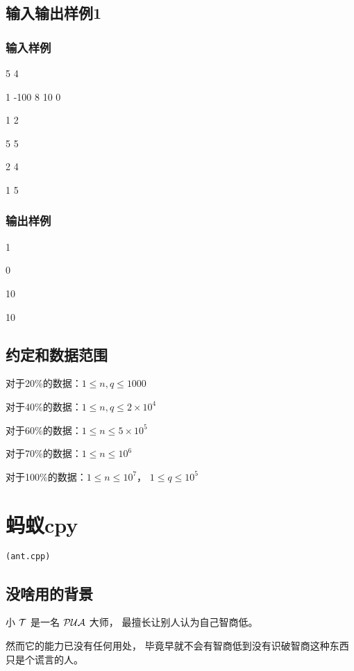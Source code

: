 \documentclass[UTF8]{ctexart}
\begin{document}
\subsection{输入输出样例1}

\subsubsection{输入样例}

5 4

1 -100 8 10 0

1 2

5 5

2 4

1 5

\subsubsection{输出样例}

1

0

10

10

\subsection{约定和数据范围}

对于20\%的数据：$1\le n,q \le 1000$

对于40\%的数据：$1\le n,q \le 2\times 10^4$

对于60\%的数据：$1\le n \le 5\times 10^5$

对于70\%的数据：$1\le n \le 10^6$

对于100\%的数据：$1 \le n \le 10^7$， $1\le q\le 10^5$

\newpage
\section{蚂蚁cpy}
\begin{center}
\tt\large{(ant.cpp)}
\end{center}

\subsection{没啥用的背景}

小 $\cal T$ 是一名 $\cal PUA$ 大师， 最擅长让别人认为自己智商低。

然而它的能力已没有任何用处， 毕竟早就不会有智商低到没有识破智商这种东西只是个谎言的人。
\end{document}
